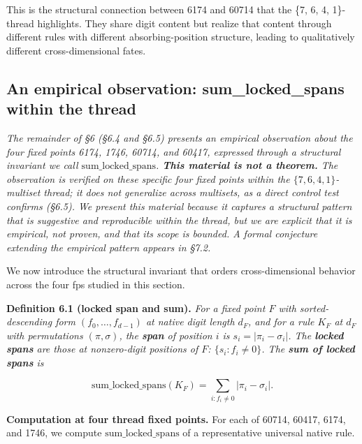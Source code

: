\documentclass[11pt,letterpaper]{article}
\theoremstyle{paperstyle}
\theoremstyle{paperstyledef}
\theoremstyle{paperstylerem}
\begin{document}
This is the structural connection between 6174 and 60714 that the \{7,
6, 4, 1\}-thread highlights. They share digit content but realize that
content through different rules with different absorbing-position
structure, leading to qualitatively different cross-dimensional fates.

\hypertarget{an-empirical-observation-sum_locked_spans-within-the-thread}{%
\subsection{An empirical observation: sum\_locked\_spans within the thread}\label{an-empirical-observation-sum_locked_spans-within-the-thread}}

\emph{The remainder of §6 (§6.4 and §6.5) presents an empirical
observation about the four fixed points 6174, 1746, 60714, and 60417,
expressed through a structural invariant we call
\(\mathrm{sum\_locked\_spans}\). \textbf{This material is not a
theorem.} The observation is verified on these specific four fixed
points within the \(\{7, 6, 4, 1\}\)-multiset thread; it does not
generalize across multisets, as a direct control test confirms (§6.5).
We present this material because it captures a structural pattern that
is suggestive and reproducible within the thread, but we are explicit
that it is empirical, not proven, and that its scope is bounded. A
formal conjecture extending the empirical pattern appears in §7.2.}

We now introduce the structural invariant that orders cross-dimensional
behavior across the four fps studied in this section.

\textbf{Definition 6.1 (locked span and sum).} \emph{For a fixed point
\(F\) with sorted-descending form \((f_0, \ldots, f_{d-1})\) at native
digit length \(d_F\), and for a rule \(K_F\) at \(d_F\) with
permutations \((\pi, \sigma)\), the \textbf{span} of position \(i\) is
\(s_i = |\pi_i - \sigma_i|\). The \textbf{locked spans} are those at
nonzero-digit positions of \(F\): \(\{s_i : f_i \neq 0\}\). The
\textbf{sum of locked spans} is}

\[\mathrm{sum\_locked\_spans}(K_F) = \sum_{i : f_i \neq 0} |\pi_i - \sigma_i|.\]

\textbf{Computation at four thread fixed points.} For each of 60714,
60417, 6174, and 1746, we compute \(\mathrm{sum\_locked\_spans}\) of a
representative universal native rule.
\end{document}
